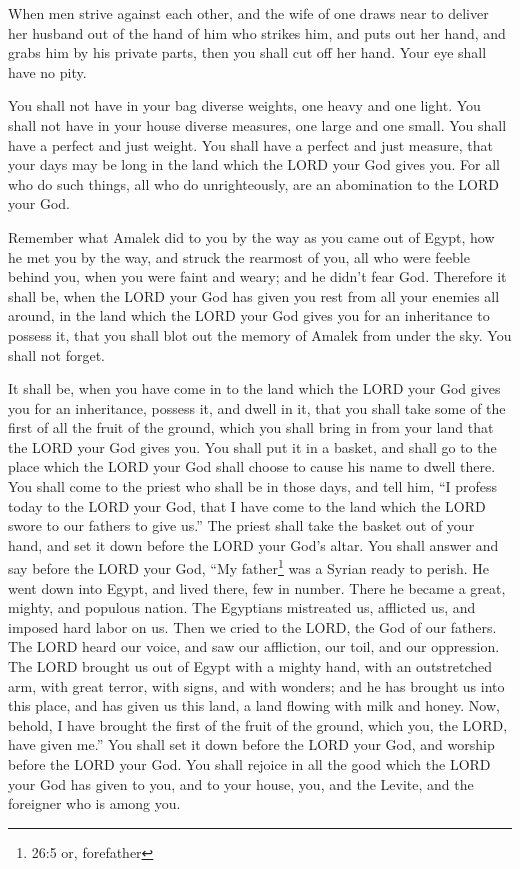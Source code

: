 \myverse{}When men strive against each other, and the wife of one draws
near to deliver her husband out of the hand of him who strikes him, and puts out her hand, and grabs him
by his private parts,
\myverse{}then you shall cut off her hand. Your eye shall have no pity.

\myverse{}You shall not have in your bag diverse weights, one heavy and
one light.
\myverse{}You shall not have in your house diverse measures, one large and one small.
\myverse{}You shall have a perfect and just weight. You shall have a perfect and just
measure, that your days may be long in the land which the LORD your God gives you.
\myverse{}For all who do such things, all who do unrighteously, are an abomination
to the LORD your God.

\myverse{}Remember what Amalek did to you by the way as you came out of
Egypt,
\myverse{}how he met you by the way, and struck the rearmost of you, all who were feeble
behind you, when you were faint and weary; and he didn’t fear God.
\myverse{}Therefore it shall be, when the LORD your God has given you rest from all
your enemies all around, in the land which the LORD your God gives you for an inheritance to possess it,
that you shall blot out the memory of Amalek from under the sky. You shall not forget.


\mychapter{} \myverse*{}It shall be, when you have come in to the land which the LORD
your God gives you for an inheritance, possess it, and dwell in it,
\myverse{}that you shall take some of the first of all the fruit of the ground, which
you shall bring in from your land that the LORD your God gives you. You shall put it in a basket, and
shall go to the place which the LORD your God shall choose to cause his name to dwell there.
\myverse{}You shall come to the priest who shall be in those days, and tell him, “I profess
today to the LORD your God, that I have come to the land which the LORD swore to our fathers to give us.”
\myverse{}The priest shall take the basket out of your hand, and set it down before the
LORD your God’s altar.
\myverse{}You shall answer and say before the LORD your God, “My father\footnote{26:5 or, forefather} was a Syrian ready to perish. He went down into Egypt, and lived there,
few in number. There he became a great, mighty, and populous nation.
\myverse{}The Egyptians mistreated us, afflicted us, and imposed hard labor on us.
\myverse{}Then we cried to the LORD, the God of our fathers. The LORD heard our voice,
and saw our affliction, our toil, and our oppression.
\myverse{}The LORD brought us out of Egypt with a mighty hand, with an outstretched arm,
with great terror, with signs, and with wonders;
\myverse{}and he has brought us into this place, and has given us this land, a land flowing
with milk and honey.
\myverse{}Now, behold, I have brought the first of the fruit of the ground, which you,
the LORD, have given me.” You shall set it down before the LORD your God, and worship before the LORD
your God.
\myverse{}You shall rejoice in all the good which the LORD your God has given to you,
and to your house, you, and the Levite, and the foreigner who is among you.

